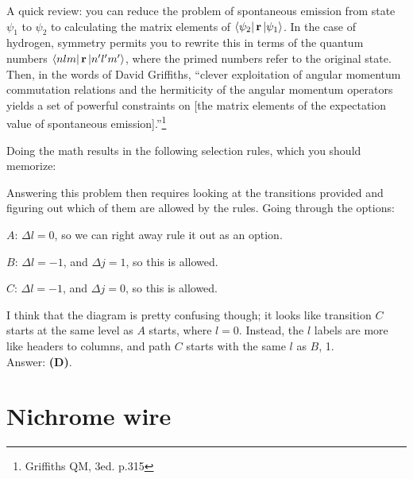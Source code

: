\documentclass[11pt]{paper}
\newcommand{\answer}[1]{Answer: \textbf{(#1)}.}
\begin{document}
A quick review: you can reduce the problem of spontaneous emission from state $\psi_1$ to $\psi_2$ to calculating the matrix elements of $\bra{\psi_2}\mathbf{r}\ket{\psi_1}$.  In the case of hydrogen, symmetry permits you to rewrite this in terms of the quantum numbers $\bra{nlm}\mathbf{r}\ket{n'l'm'}$, where the primed numbers refer to the original state.  Then, in the words of David Griffiths, ``clever exploitation of angular momentum commutation relations and the hermiticity of the angular momentum operators yields a set of powerful constraints on [the matrix elements of the expectation value of spontaneous emission].''\footnote{Griffiths QM, 3ed. p.315}

Doing the math results in the following selection rules, which you should memorize:
\begin{center}
\end{center}

Answering this problem then requires looking at the transitions provided and figuring out which of them are allowed by the rules.  Going through the options:

$A$: $\Delta l = 0$, so we can right away rule it out as an option.

$B$: $\Delta l = -1$, and $\Delta j = 1$, so this is allowed.

$C$: $\Delta l = -1$, and $\Delta j = 0$, so this is allowed.

I think that the diagram is pretty confusing though; it looks like transition $C$ starts at the same level as $A$ starts, where $l=0$.  Instead, the $l$ labels are more like headers to columns, and path $C$ starts with the same $l$ as $B$, 1.\\

\answer{D}

\section{Nichrome wire}
\end{document}
